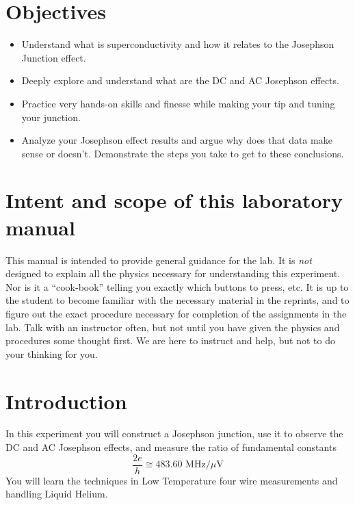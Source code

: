 \documentclass{../lab}
\begin{document}
\section{Objectives}

\begin{itemize}
    \item Understand what is superconductivity and how it relates to the Josephson Junction effect.

    \item Deeply explore and understand what are the DC and AC Josephson effects.

    \item Practice very hands-on skills and finesse while making your tip and tuning your junction.

    \item Analyze your Josephson effect results and argue why does that data make sense or doesn't. Demonstrate the steps you take to get to these conclusions.

\end{itemize}

\section{Intent and scope of this laboratory manual}

This manual is intended to provide general guidance for the lab. It is \emph{not} designed to explain all the physics necessary for understanding this experiment. Nor is it a ``cook-book'' telling you exactly which buttons to press, etc. It is up to the student to become familiar with the necessary material in the reprints, and to figure out the exact procedure necessary for completion of the assignments in the lab. Talk with an instructor often, but not until you have given the physics and procedures some thought first. We are here to instruct and help, but not to do your thinking for you.

\section{Introduction}

In this experiment you will construct a Josephson junction, use it to observe the DC and AC Josephson effects, and measure the ratio of fundamental constants
\begin{equation}
    \frac{2e}{h} \cong 483.60 \textrm{ MHz}/\mu \textrm{V}
\end{equation}
You will learn the techniques in Low Temperature four wire measurements and handling Liquid Helium.
\end{document}
